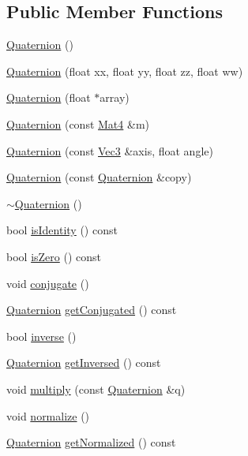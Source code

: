 \subsection*{Public Member Functions}
\begin{DoxyCompactItemize}
\item 
\hyperlink{classQuaternion_abcc01358aada56ea5f0db4da18aaf77d}{Quaternion} ()
\item 
\hyperlink{classQuaternion_a4dcf5b1a3c937b45a0d38ccd4ad6945f}{Quaternion} (float xx, float yy, float zz, float ww)
\item 
\hyperlink{classQuaternion_a27f24bbf6a82546ba6a9fcbb927d882f}{Quaternion} (float $\ast$array)
\item 
\hyperlink{classQuaternion_a190681ee2747fb575ee2dd9ba670981d}{Quaternion} (const \hyperlink{classMat4}{Mat4} \&m)
\item 
\hyperlink{classQuaternion_a58c28df43d7a0624734db4635cb98182}{Quaternion} (const \hyperlink{classVec3}{Vec3} \&axis, float angle)
\item 
\hyperlink{classQuaternion_aea3b87270ed824acf7250b2a94c4af8d}{Quaternion} (const \hyperlink{classQuaternion}{Quaternion} \&copy)
\item 
\hyperlink{classQuaternion_a5f834c2ca469cd71edc8a23fdc3f56e8}{$\sim$\+Quaternion} ()
\item 
bool \hyperlink{classQuaternion_a64550e3147014607c42d40fc3bb7080b}{is\+Identity} () const
\item 
bool \hyperlink{classQuaternion_ab355dcc6194b9dcf4f303a1afec9f0b2}{is\+Zero} () const
\item 
void \hyperlink{classQuaternion_ae387bec8f394bdc58a5ac1480f11140f}{conjugate} ()
\item 
\hyperlink{classQuaternion}{Quaternion} \hyperlink{classQuaternion_a340e18206128073f5457258284386974}{get\+Conjugated} () const
\item 
bool \hyperlink{classQuaternion_aabe14be8bd8676241317449595cdcfff}{inverse} ()
\item 
\hyperlink{classQuaternion}{Quaternion} \hyperlink{classQuaternion_acab26dc0925530cf5d58c92e5fbb9e5a}{get\+Inversed} () const
\item 
void \hyperlink{classQuaternion_ad4acdaaea6f57183536015a0b0aec661}{multiply} (const \hyperlink{classQuaternion}{Quaternion} \&q)
\item 
void \hyperlink{classQuaternion_a48e6bafb249c895ed25f29dc9170e11e}{normalize} ()
\item 
\hyperlink{classQuaternion}{Quaternion} \hyperlink{classQuaternion_a203c9c6bf25dcd25bfc25fbe17ec4481}{get\+Normalized} () const

\end{DoxyCompactItemize}
